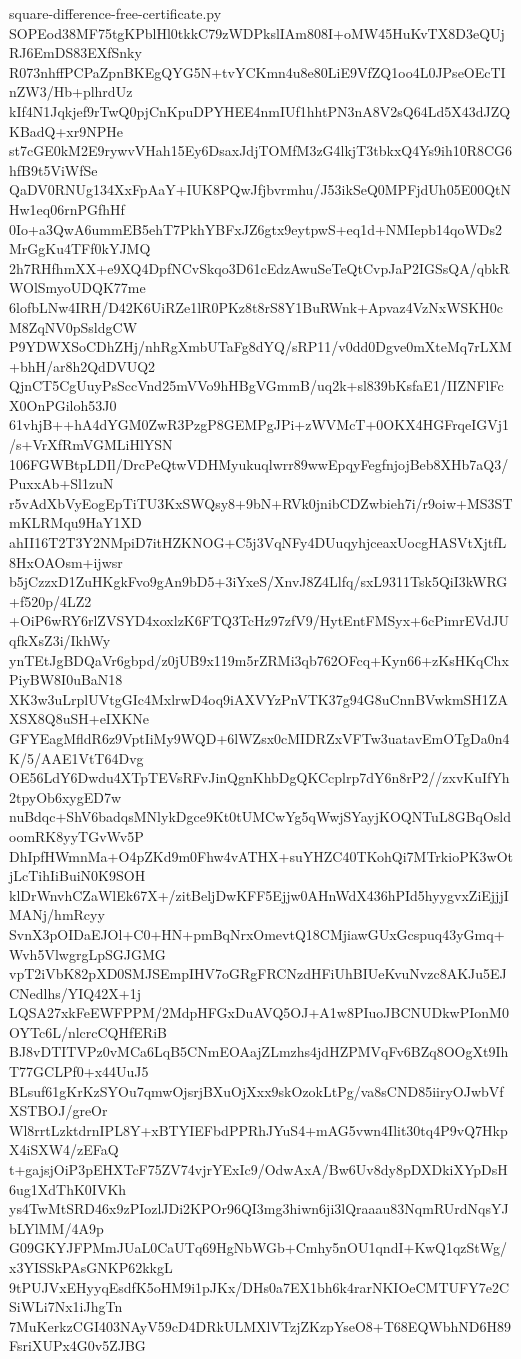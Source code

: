 \documentclass[11pt]{article}
\theoremstyle{definition}
\theoremstyle{remark}
\begin{document}
\begin{filecontents*}[overwrite]{square-difference-free-certificate.py}
SOPEod38MF75tgKPblHl0tkkC79zWDPkslIAm808I+oMW45HuKvTX8D3eQUjRJ6EmDS83EXfSnky
R073nhffPCPaZpnBKEgQYG5N+tvYCKmn4u8e80LiE9VfZQ1oo4L0JPseOEcTInZW3/Hb+plhrdUz
kIf4N1Jqkjef9rTwQ0pjCnKpuDPYHEE4nmIUf1hhtPN3nA8V2sQ64Ld5X43dJZQKBadQ+xr9NPHe
st7cGE0kM2E9rywvVHah15Ey6DsaxJdjTOMfM3zG4lkjT3tbkxQ4Ys9ih10R8CG6hfB9t5ViWfSe
QaDV0RNUg134XxFpAaY+IUK8PQwJfjbvrmhu/J53ikSeQ0MPFjdUh05E00QtNHw1eq06rnPGfhHf
0Io+a3QwA6ummEB5ehT7PkhYBFxJZ6gtx9eytpwS+eq1d+NMIepb14qoWDs2MrGgKu4TFf0kYJMQ
2h7RHfhmXX+e9XQ4DpfNCvSkqo3D61cEdzAwuSeTeQtCvpJaP2IGSsQA/qbkRWOlSmyoUDQK77me
6lofbLNw4IRH/D42K6UiRZe1lR0PKz8t8rS8Y1BuRWnk+Apvaz4VzNxWSKH0cM8ZqNV0pSsldgCW
P9YDWXSoCDhZHj/nhRgXmbUTaFg8dYQ/sRP11/v0dd0Dgve0mXteMq7rLXM+bhH/ar8h2QdDVUQ2
QjnCT5CgUuyPsSccVnd25mVVo9hHBgVGmmB/uq2k+sl839bKsfaE1/IIZNFlFcX0OnPGiloh53J0
61vhjB++hA4dYGM0ZwR3PzgP8GEMPgJPi+zWVMcT+0OKX4HGFrqeIGVj1/s+VrXfRmVGMLiHlYSN
106FGWBtpLDIl/DrcPeQtwVDHMyukuqlwrr89wwEpqyFegfnjojBeb8XHb7aQ3/PuxxAb+Sl1zuN
r5vAdXbVyEogEpTiTU3KxSWQsy8+9bN+RVk0jnibCDZwbieh7i/r9oiw+MS3STmKLRMqu9HaY1XD
ahII16T2T3Y2NMpiD7itHZKNOG+C5j3VqNFy4DUuqyhjceaxUocgHASVtXjtfL8HxOAOsm+ijwsr
b5jCzzxD1ZuHKgkFvo9gAn9bD5+3iYxeS/XnvJ8Z4Llfq/sxL9311Tsk5QiI3kWRG+f520p/4LZ2
+OiP6wRY6rlZVSYD4xoxlzK6FTQ3TcHz97zfV9/HytEntFMSyx+6cPimrEVdJUqfkXsZ3i/IkhWy
ynTEtJgBDQaVr6gbpd/z0jUB9x119m5rZRMi3qb762OFcq+Kyn66+zKsHKqChxPiyBW8I0uBaN18
XK3w3uLrplUVtgGIc4MxlrwD4oq9iAXVYzPnVTK37g94G8uCnnBVwkmSH1ZAXSX8Q8uSH+eIXKNe
GFYEagMfldR6z9VptIiMy9WQD+6lWZsx0cMIDRZxVFTw3uatavEmOTgDa0n4K/5/AAE1VtT64Dvg
OE56LdY6Dwdu4XTpTEVsRFvJinQgnKhbDgQKCcplrp7dY6n8rP2//zxvKuIfYh2tpyOb6xygED7w
nuBdqc+ShV6badqsMNlykDgce9Kt0tUMCwYg5qWwjSYayjKOQNTuL8GBqOsldoomRK8yyTGvWv5P
DhIpfHWmnMa+O4pZKd9m0Fhw4vATHX+suYHZC40TKohQi7MTrkioPK3wOtjLcTihIiBuiN0K9SOH
klDrWnvhCZaWlEk67X+/zitBeljDwKFF5Ejjw0AHnWdX436hPId5hyygvxZiEjjjIMANj/hmRcyy
SvnX3pOIDaEJOl+C0+HN+pmBqNrxOmevtQ18CMjiawGUxGcspuq43yGmq+Wvh5VlwgrgLpSGJGMG
vpT2iVbK82pXD0SMJSEmpIHV7oGRgFRCNzdHFiUhBIUeKvuNvzc8AKJu5EJCNedlhs/YIQ42X+1j
LQSA27xkFeEWFPPM/2MdpHFGxDuAVQ5OJ+A1w8PIuoJBCNUDkwPIonM0OYTc6L/nlcrcCQHfERiB
BJ8vDTITVPz0vMCa6LqB5CNmEOAajZLmzhs4jdHZPMVqFv6BZq8OOgXt9IhT77GCLPf0+x44UuJ5
BLsuf61gKrKzSYOu7qmwOjsrjBXuOjXxx9skOzokLtPg/va8sCND85iiryOJwbVfXSTBOJ/greOr
Wl8rrtLzktdrnIPL8Y+xBTYIEFbdPPRhJYuS4+mAG5vwn4Ilit30tq4P9vQ7HkpX4iSXW4/zEFaQ
t+gajsjOiP3pEHXTcF75ZV74vjrYExIc9/OdwAxA/Bw6Uv8dy8pDXDkiXYpDsH6ug1XdThK0IVKh
ys4TwMtSRD46x9zPIozlJDi2KPOr96QI3mg3hiwn6ji3lQraaau83NqmRUrdNqsYJbLYlMM/4A9p
G09GKYJFPMmJUaL0CaUTq69HgNbWGb+Cmhy5nOU1qndI+KwQ1qzStWg/x3YISSkPAsGNKP62kkgL
9tPUJVxEHyyqEsdfK5oHM9i1pJKx/DHs0a7EX1bh6k4rarNKIOeCMTUFY7e2CSiWLi7Nx1iJhgTn
7MuKerkzCGI403NAyV59cD4DRkULMXlVTzjZKzpYseO8+T68EQWbhND6H89FsriXUPx4G0v5ZJBG

\end{filecontents*}
\end{document}

